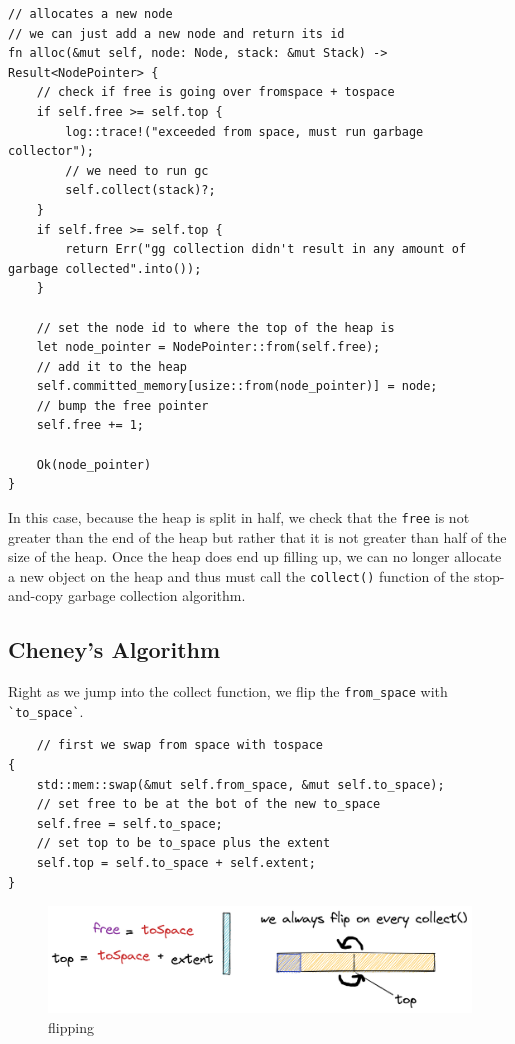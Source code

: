 \documentclass[index]{subfiles}
\begin{document}
\begin{verbatim}
// allocates a new node
// we can just add a new node and return its id
fn alloc(&mut self, node: Node, stack: &mut Stack) -> Result<NodePointer> {
    // check if free is going over fromspace + tospace
    if self.free >= self.top {
        log::trace!("exceeded from space, must run garbage collector");
        // we need to run gc
        self.collect(stack)?;
    }
    if self.free >= self.top {
        return Err("gg collection didn't result in any amount of garbage collected".into());
    }

    // set the node id to where the top of the heap is
    let node_pointer = NodePointer::from(self.free);
    // add it to the heap
    self.committed_memory[usize::from(node_pointer)] = node;
    // bump the free pointer
    self.free += 1;

    Ok(node_pointer)
}
\end{verbatim}

In this case, because the heap is split in half, we check that the \verb+free+ is not greater than the end of the heap but rather that it is not greater than half of the size of the heap. Once the heap does end up filling up, we can no longer allocate a new object on the heap and thus must call the \verb+collect()+ function of the stop-and-copy garbage collection algorithm.

\subsection{Cheney's Algorithm}

Right as we jump into the collect function, we flip the \verb+from_space+ with \verb+`to_space`+.


\begin{verbatim}
    // first we swap from space with tospace
{
    std::mem::swap(&mut self.from_space, &mut self.to_space);
    // set free to be at the bot of the new to_space
    self.free = self.to_space;
    // set top to be to_space plus the extent
    self.top = self.to_space + self.extent;
}
\end{verbatim}

\begin{figure}[H]
    \centering
    \includegraphics[scale=0.3]{pics/flipping.png}
    \caption{flipping}
\end{figure}
\end{document}
